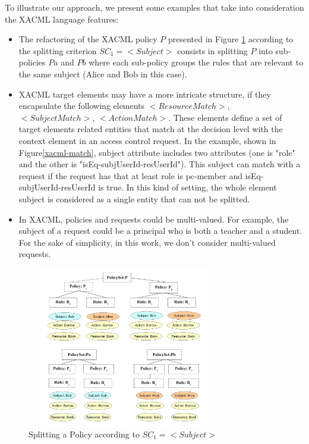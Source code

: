 To illustrate our approach, we present some examples that take into consideration the XACML language features:
\begin{itemize}
\item The refactoring of the XACML policy $P$ presented in Figure \ref{splitting} according to the splitting criterion $SC_{1}=<Subject>$ consists in splitting $P$ 
into sub-policies $Pa$ and $Pb$ where each sub-policy groups the rules that are relevant to the same subject (Alice and Bob in this case). 

\item
XACML target elements may have a more intricate structure, if they encapsulate the following elements $<ResourceMatch>$, $<SubjectMatch>$, $<ActionMatch>$.
These elements define a set of target elements related entities that match at the decision level with the context element in 
an access control request. In the example, shown in Figure\ref{xacml-match}, subject attribute includes two attributes (one is "role" and the other is "isEq-subjUserId-resUserId"). 
This subject can match with a request if the request has that at least role is pc-member and isEq-subjUserId-resUserId is true. In this kind of setting, the whole element subject is considered 
as a single entity that can not be splitted.

\item 

In XACML, policies and requests could be multi-valued. For example, the subject of a request could be a principal who is both a teacher and a student.
For the sake of simplicity, in this work, we don't consider multi-valued requests.
\end{itemize}
\begin{figure}[!h]
\begin{center}
\includegraphics[width=8.5cm, height=7cm]{splitting}
\caption{Splitting a Policy according to $SC_{1}=<Subject>$}
\label{splitting}
\end{center}
\end{figure} 


